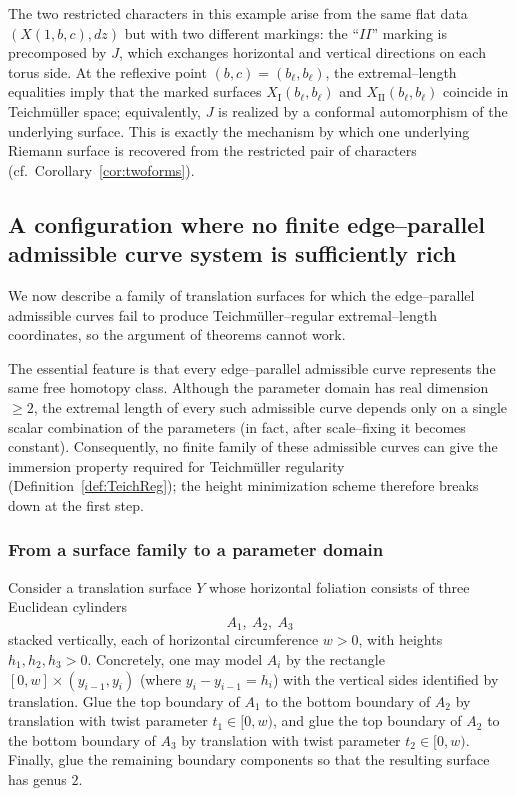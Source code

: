 \documentclass[a4paper,12pt]{amsart}
\theoremstyle{plain}
\theoremstyle{definition}
\begin{document}
The two restricted characters in this example arise from the same flat data \((X(1,b,c),dz)\) but with two
different markings: the ``$II$'' marking is precomposed by \(J\), which exchanges horizontal and vertical
directions on each torus side.
At the reflexive point \((b,c)=(b_\ell,b_\ell)\), the extremal--length equalities imply that the marked surfaces
\(X_{\mathrm{I}}(b_\ell,b_\ell)\) and \(X_{\mathrm{II}}(b_\ell,b_\ell)\) coincide in Teichm\"uller space; equivalently, \(J\) is realized by a conformal
automorphism of the underlying surface.
This is exactly the mechanism by which one underlying Riemann surface is recovered from the restricted pair
of characters (cf.\ Corollary~\ref{cor:twoforms}).

\subsection{A configuration where no finite edge--parallel admissible curve system is sufficiently rich}\label{subsec:bad_example}

We now describe a family of translation surfaces for which the edge--parallel admissible curves
fail to produce Teichm\"uller--regular extremal--length coordinates, so the  argument of theorems cannot work.

The essential feature is that every edge--parallel admissible curve represents the same free
homotopy class.  Although the parameter domain has real dimension \(\ge 2\), the extremal length of
every such admissible curve depends only on a single scalar combination of the parameters (in fact,
after scale--fixing it becomes constant).  Consequently, no finite family of these admissible curves can
give the immersion property required for Teichm\"uller regularity
(Definition~\ref{def:TeichReg}); the height minimization scheme therefore breaks down at the first step.

\subsubsection{From a surface family to a parameter domain}
Consider a translation surface \(Y\) whose horizontal foliation consists of three Euclidean cylinders
\[
A_1,\ A_2,\ A_3
\]
stacked vertically, each of horizontal circumference \(w>0\), with heights \(h_1,h_2,h_3>0\).
Concretely, one may model \(A_i\) by the rectangle \([0,w]\times (y_{i-1},y_i)\) (where \(y_i-y_{i-1}=h_i\))
with the vertical sides identified by translation.
Glue the top boundary of \(A_1\) to the bottom boundary of \(A_2\) by translation with twist parameter
\(t_1\in[0,w)\), and glue the top boundary of \(A_2\) to the bottom boundary of \(A_3\) by translation with
twist parameter \(t_2\in[0,w)\).
Finally, glue the remaining boundary components so that the resulting surface has genus \(2\).
\end{document}
